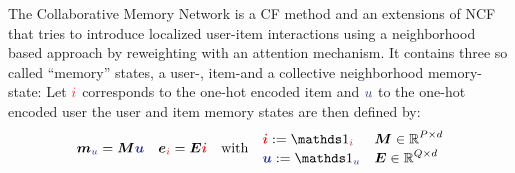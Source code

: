 \nospacing
The Collaborative Memory Network is a CF method and an extensions of NCF \cite{he2017neural} that tries to introduce 
localized user-item interactions using a neighborhood based approach by reweighting with an attention mechanism.
It contains three so called ``memory'' states, a user-, item-and a collective neighborhood memory-state:
Let $\idxi$ corresponds to the one-hot encoded item and $\idxu$ to the one-hot encoded user the user and item memory states are then defined by:
\begin{align*}
  \vec{m}_{\idxu}=\vec{M}\vec{\idxu}&&\vec{e}_{\idxi}=\vec{E}\vec{\idxi}&&\text{with}&&
   \begin{aligned}
    &\vec{\idxi}:=\unitVector_{\idxi}&&\vec{M}\in\R^{P\times d}\\[-1\jot]
    &\vec{\idxu}:=\unitVector_{\idxu}&&\vec{E}\in\R^{Q\times d}
   \end{aligned}                                                                         
\end{align*}
